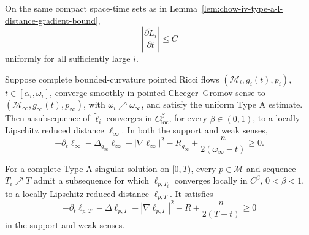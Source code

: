 \begin{lemma}
\label{lem:chow-iv-type-a-l-distance-time-bound}


On the same compact space-time sets as in
Lemma~\ref{lem:chow-iv-type-a-l-distance-gradient-bound},
\[
 \left|\frac{\partial\widetilde L_i}{\partial t}\right|\leq C
\]
uniformly for all sufficiently large \(i\).
\end{lemma}

\begin{theorem}
\label{thm:chow-iv-singular-time-reduced-distance-limit}


Suppose complete bounded-curvature pointed Ricci flows
\((\mathcal M_i,g_i(t),p_i)\), \(t\in[\alpha_i,\omega_i]\), converge smoothly
in pointed Cheeger--Gromov sense to
\((\mathcal M_\infty,g_\infty(t),p_\infty)\), with
\(\omega_i\nearrow\omega_\infty\), and satisfy the uniform Type A estimate.
Then a subsequence of \(\widetilde\ell_i\) converges in
\(C^\beta_{\mathrm{loc}}\), for every \(\beta\in(0,1)\), to a locally
Lipschitz reduced distance \(\ell_\infty\).  In both the support and weak
senses,
\[
 -\partial_t\ell_\infty-\Delta_{g_\infty}\ell_\infty
 +|\nabla\ell_\infty|^2-R_{g_\infty}
 +\frac{n}{2(\omega_\infty-t)}\geq0.
\]
\end{theorem}

\begin{corollary}
\label{cor:chow-iv-type-a-singular-time-reduced-distance}


For a complete Type A singular solution on \([0,T)\), every \(p\in\mathcal M\)
and sequence \(T_i\nearrow T\) admit a subsequence for which
\(\ell_{p,T_i}\) converges locally in \(C^\beta\), \(0<\beta<1\), to a
locally Lipschitz reduced distance \(\ell_{p,T}\).  It satisfies
\[
 -\partial_t\ell_{p,T}-\Delta\ell_{p,T}+|\nabla\ell_{p,T}|^2-R
 +\frac{n}{2(T-t)}\geq0
\]
in the support and weak senses.
\end{corollary}

